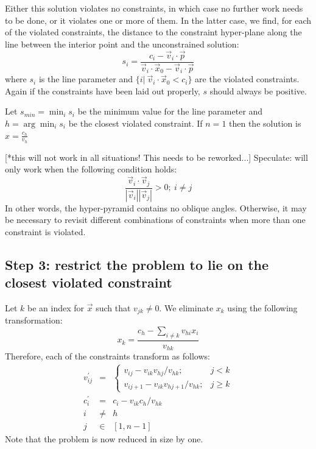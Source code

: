 \documentclass{article}
\begin{document}
Either this solution violates no constraints,
in which case no further work needs to be done, or
it violates one or more of them. In the latter case, we find, for each of the
violated constraints, the distance
to the constraint hyper-plane along the line between the interior point and
the unconstrained solution:
\begin{equation}
	s_i = \frac{c_i - \vec v_i \cdot \vec p}
	{\vec v_i \cdot \vec x_0 - \vec v_i \cdot \vec p}
\end{equation}
where $s_i$ is the line parameter and
$\lbrace i |~\vec v_i \cdot \vec x_0 < c_i \rbrace$ are the violated
constraints. Again if the constraints have been laid out properly, $s$ should
always be positive.

Let $s_{min}=\min_i s_i$ be the minimum value for the line parameter and 
$h=\arg \min_i s_i$ be the closest violated constraint.
If $n=1$ then the solution is $x=\frac{c_h}{v_h}$

[*this will not work in all situations! This needs to be reworked...]
Speculate: will only work when the following condition holds:
\begin{equation}
	\frac{\vec v_i \cdot \vec v_j}{|\vec v_i||\vec v_j|} > 0;~i \ne j
\end{equation}
In other words, the hyper-pyramid contains no oblique angles.
Otherwise, it may be necessary to revisit different combinations of constraints
when more than one constraint is violated.

\subsection{Step 3: restrict the problem to lie on the closest violated constraint}

Let $k$ be an index for $\vec x$ such that $v_{jk} \ne 0$. 
We eliminate $x_k$ using the following transformation:
\begin{equation}
	x_k = \frac{c_h - \sum_{i \ne k} v_{hi} x_i}{v_{hk}}
	\label{constraint_application}
\end{equation}
Therefore, each of the constraints transform as follows:
\begin{eqnarray}
	v_{ij}^\prime & = & \left \lbrace \begin{array}{rc} 
	v_{ij} - {v_{ik} v_{hj}}/{v_{hk}} ; & j < k \\
	v_{ij+1} - {v_{ik} v_{hj+1}}/{v_{hk}} ; & j \ge k
	\end{array} \right . \\
	c_i^\prime & = & c_i - {v_{ik} c_h}/{v_{hk}} \\
	i & \ne & h \\
	j & \in & [1, n-1]
\end{eqnarray}
Note that the problem is now reduced in size by one.
\end{document}

